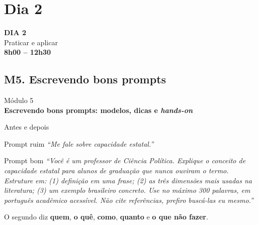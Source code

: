 \documentclass[11pt,aspectratio=169,t]{beamer}
\newcommand{\transicao}[2]{%
  \begin{frame}[plain]
    \centering
    \vspace*{2.2cm}
    {\large\color{cinzaescuro} #1}\\[0.8cm]
    {\Large\color{azulUNI}\textbf{#2}}
  \end{frame}}
\newcommand{\aberturadia}[3]{%
  \begin{frame}[plain]
    \centering
    \vspace*{1.6cm}
    {\Huge\color{azulUNI}\textbf{#1}}\\[0.6cm]
    {\large\color{cinzaescuro} #2}\\[1.2cm]
    {\normalsize\color{laranjaDestaque}\textbf{#3}}
  \end{frame}}
\begin{document}
\section{Dia 2}
\aberturadia{DIA 2}{Praticar e aplicar}{8h00 -- 12h30}

\subsection{M5. Escrevendo bons prompts}
\transicao{Módulo 5}{Escrevendo bons prompts: modelos, dicas e \textit{hands-on}}

\begin{frame}{Antes e depois}
  \begin{alertblock}{Prompt ruim}
    \centering\textit{``Me fale sobre capacidade estatal.''}
  \end{alertblock}
  \pause
  \begin{exampleblock}{Prompt bom}
    \small
    \textit{``Você é um professor de Ciência Política. Explique o conceito de capacidade estatal para alunos de graduação que nunca ouviram o termo. Estruture em: (1) definição em uma frase; (2) as três dimensões mais usadas na literatura; (3) um exemplo brasileiro concreto. Use no máximo 300 palavras, em português acadêmico acessível. Não cite referências, prefiro buscá-las eu mesmo.''}
  \end{exampleblock}
  \pause
  \centering\small O segundo diz \textbf{quem}, \textbf{o quê}, \textbf{como}, \textbf{quanto} e \textbf{o que não fazer}.
\end{frame}
\end{document}
